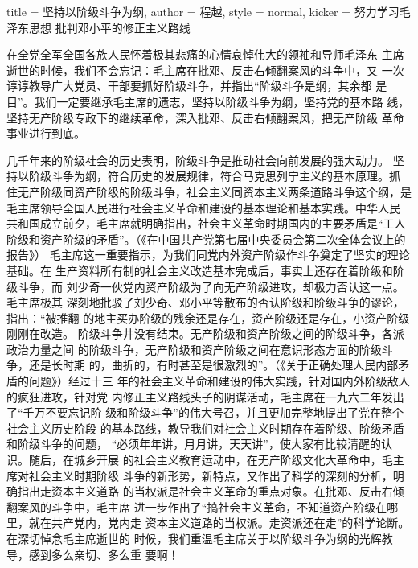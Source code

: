 \begin{hongqiarticle}{
        title  = {坚持以阶级斗争为纲},
        author = {程越},
        style  = normal,
        kicker = {努力学习毛泽东思想 批判邓小平的修正主义路线}
    }

    在全党全军全国各族人民怀着极其悲痛的心情哀悼伟大的领袖和导师毛泽东
    主席逝世的时候，我们不会忘记：毛主席在批邓、反击右倾翻案风的斗争中，又
    一次谆谆教导广大党员、干部要抓好阶级斗争，并指出“阶级斗争是纲，其余都
    是目”。我们一定要继承毛主席的遗志，坚持以阶级斗争为纲，坚持党的基本路
    线，坚持无产阶级专政下的继续革命，深入批邓、反击右倾翻案风，把无产阶级
    革命事业进行到底。

    几千年来的阶级社会的历史表明，阶级斗争是推动社会向前发展的强大动力。
    坚持以阶级斗争为纲，符合历史的发展规律，符合马克思列宁主义的基本原理。抓
    住无产阶级同资产阶级的阶级斗争，社会主义同资本主义两条道路斗争这个纲，是
    毛主席领导全国人民进行社会主义革命和建设的基本理论和基本实践。中华人民
    共和国成立前夕，毛主席就明确指出，社会主义革命时期国内的主要矛盾是“工人
    阶级和资产阶级的矛盾”。（《在中国共产党第七届中央委员会第二次全体会议上的报告》）
    毛主席这一重要指示，为我们同党内外资产阶级作斗争奠定了坚实的理论基础。在
    生产资料所有制的社会主义改造基本完成后，事实上还存在着阶级和阶级斗争，而
    刘少奇一伙党内资产阶级为了向无产阶级进攻，却极力否认这一点。毛主席极其
    深刻地批驳了刘少奇、邓小平等散布的否认阶级和阶级斗争的谬论，指出：“被推翻
    的地主买办阶级的残余还是存在，资产阶级还是存在，小资产阶级刚刚在改造。
    阶级斗争井没有结束。无产阶级和资产阶级之间的阶级斗争，各派政治力量之间
    的阶级斗争，无产阶级和资产阶级之间在意识形态方面的阶级斗争，还是长时期
    的，曲折的，有时甚至是很激烈的”。（《关于正确处理人民内部矛盾的问题》）经过十三
    年的社会主义革命和建设的伟大实践，针对国内外阶级敌人的疯狂进攻，针对党
    内修正主义路线头子的阴谋活动，毛主席在一九六二年发出了“千万不要忘记阶
    级和阶级斗争”的伟大号召，并且更加完整地提出了党在整个社会主义历史阶段
    的基本路线，教导我们对社会主义时期存在着阶级、阶级矛盾和阶级斗争的问题，
    “必须年年讲，月月讲，天天讲”，使大家有比较清醒的认识。随后，在城乡开展
    的社会主义教育运动中，在无产阶级文化大革命中，毛主席对社会主义时期阶级
    斗争的新形势，新特点，又作出了科学的深刻的分析，明确指出走资本主义道路
    的当权派是社会主义革命的重点对象。在批邓、反击右倾翻案风的斗争中，毛主席
    进一步作出了“搞社会主义革命，不知道资产阶级在哪里，就在共产党内，党内走
    资本主义道路的当权派。走资派还在走”的科学论断。在深切悼念毛主席逝世的
    时候，我们重温毛主席关于以阶级斗争为纲的光辉教导，感到多么亲切、多么重
    要啊！


\end{hongqiarticle}
